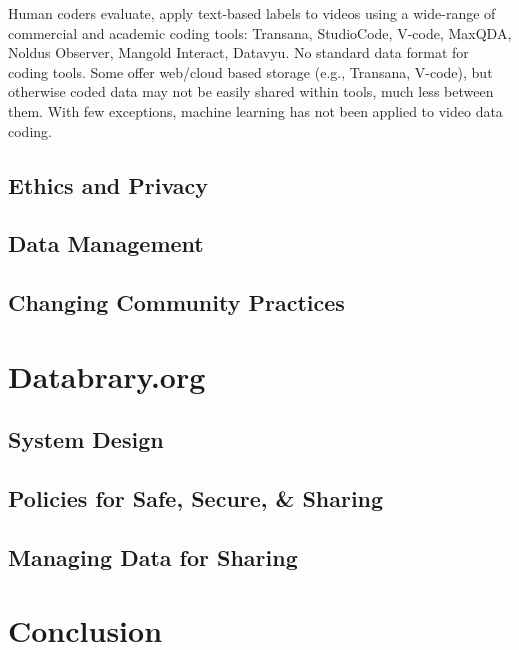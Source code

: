 \documentclass[letterpaper,man,natbib]{apa6}
\begin{document}
Human coders evaluate, apply text-based labels to videos using a wide-range of commercial and academic coding tools: Transana, StudioCode, V-code, MaxQDA, Noldus Observer, Mangold Interact, Datavyu.
No standard data format for coding tools.
Some offer web/cloud based storage (e.g., Transana, V-code), but otherwise coded data may not be easily shared within tools, much less between them.
With few exceptions, machine learning has not been applied to video data coding.

\subsection{Ethics and Privacy}

\subsection{Data Management}

\subsection{Changing Community Practices}

\section{Databrary.org}

\subsection{System Design}

\subsection{Policies for Safe, Secure, \& Sharing}

\subsection{Managing Data for Sharing}

\section{Conclusion}


\end{document}
